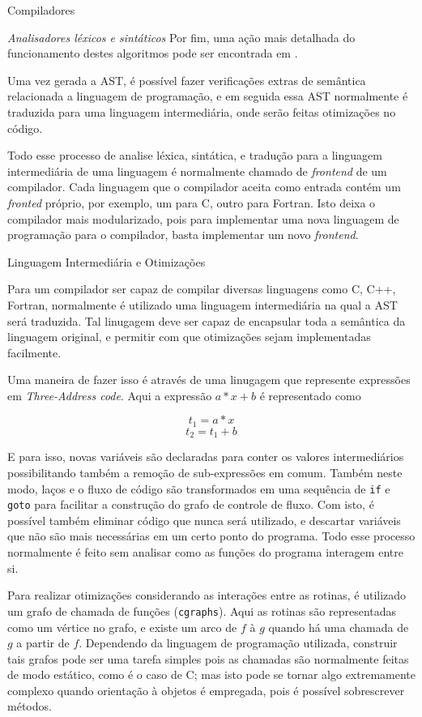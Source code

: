\begin{section}{Compiladores}
\begin{subsection}{\textit{Analisadores léxicos e sintáticos}}
    Por fim, uma ação mais detalhada do funcionamento destes algoritmos
pode ser encontrada em \citep{appel2004modern}.

    Uma vez gerada a AST, é possível fazer verificações extras de semântica
relacionada a linguagem de programação, e em seguida essa AST normalmente é
traduzida para uma linguagem intermediária, onde serão feitas otimizações
no código.

Todo esse processo de analise léxica, sintática, e tradução
para a linguagem intermediária de uma linguagem é normalmente chamado de
\textit{frontend} de um compilador. Cada linguagem que o compilador aceita
como entrada contém um \textit{fronted} próprio, por exemplo, um para C,
outro para Fortran. Isto deixa o compilador mais modularizado, pois para
implementar uma nova linguagem de programação para o compilador, basta
implementar um novo \textit{frontend}.

\end{subsection}

\begin{subsection}{Linguagem Intermediária e Otimizações}

    Para um compilador ser capaz de compilar diversas linguagens como C, C++,
Fortran, normalmente é utilizado uma linguagem intermediária na qual a AST
será traduzida. Tal linugagem deve ser capaz de encapsular toda a
semântica da linguagem original, e permitir com que otimizações sejam
implementadas facilmente.

    Uma maneira de fazer isso é através de uma linugagem que represente
expressões em \textit{Three-Address code}. Aqui a expressão $a*x + b$ é
representado como

$$ t_1 = a*x$$
$$ t_2 = t_1 + b $$

    E para isso, novas variáveis são declaradas para conter os valores
intermediários possibilitando também a remoção de sub-expressões em comum.
Também neste modo, laços e o fluxo de código são transformados em
uma sequência de \texttt{if} e \texttt{goto} para facilitar a construção do
grafo de controle de fluxo. Com isto, é possível também eliminar código que
nunca será utilizado, e descartar variáveis que não são mais necessárias em
um certo ponto do programa. Todo esse processo normalmente é feito sem
analisar como as funções do programa interagem entre si.

    Para realizar otimizações considerando as interações entre as rotinas,
é utilizado um grafo de chamada de funções (\texttt{cgraphs}). Aqui as rotinas são
representadas como um vértice no grafo, e existe um arco de $f$ à $g$
quando há uma chamada de $g$ a partir de $f$. Dependendo da linguagem de
programação utilizada, construir tais grafos pode ser uma tarefa simples pois
as chamadas são normalmente feitas de modo estático, como é o caso de C; mas
isto pode se tornar algo extremamente complexo quando orientação à objetos é
empregada, pois é possível sobrescrever métodos.


\end{subsection}
\end{section}
